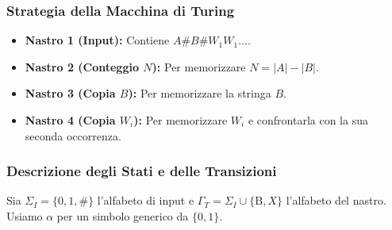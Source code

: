\documentclass[a4paper]{article}
\newcommand{\B}{\text{B}} %
\begin{document}
\subsubsection{Strategia della Macchina di Turing}
\begin{itemize}
    \item \textbf{Nastro 1 (Input):} Contiene $A\#B\#W_1 W_1 \dots$.
    \item \textbf{Nastro 2 (Conteggio $N$):} Per memorizzare $N = |A| - |B|$.
    \item \textbf{Nastro 3 (Copia $B$):} Per memorizzare la stringa $B$.
    \item \textbf{Nastro 4 (Copia $W_i$):} Per memorizzare $W_i$ e confrontarla con la sua seconda occorrenza.
\end{itemize}

\subsubsection{Descrizione degli Stati e delle Transizioni}
Sia $\Sigma_I = \{0,1,\#\}$ l'alfabeto di input e $\Gamma_T = \Sigma_I \cup \{\B, X\}$ l'alfabeto del nastro. Usiamo $\alpha$ per un simbolo generico da $\{0,1\}$.
\end{document}
